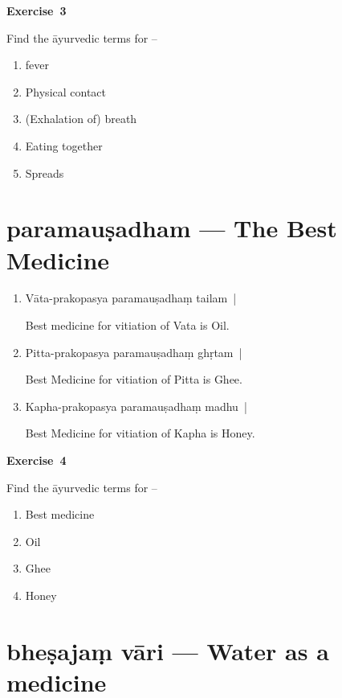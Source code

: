 \centerline{\textbf{Exercise~3}}

Find the āyurvedic terms for –
\begin{enumerate}
\itemsep=0pt
\renewcommand{\theenumi}{\alph{enumi}}
\renewcommand{\labelenumi}{\theenumi.}
\item fever
\item Physical contact 
\item (Exhalation of) breath
\item Eating together 
\item Spreads 
\end{enumerate}

\chapter{paramauṣadham --- The Best Medicine}

\begin{enumerate}
\itemsep=0pt
\item {}

Vāta-prakopasya paramauṣadhaṃ tailam~|

Best medicine for vitiation of Vata is Oil.

\item {}

Pitta-prakopasya paramauṣadhaṃ ghṛtam~|

Best Medicine for vitiation of Pitta is Ghee.

\item {}

Kapha-prakopasya paramauṣadhaṃ madhu~|

Best Medicine for vitiation of Kapha is Honey. 
\end{enumerate}

\centerline{\textbf{Exercise~4}}

Find the āyurvedic terms for –
\begin{enumerate}
\itemsep=0pt
\renewcommand{\theenumi}{\alph{enumi}}
\renewcommand{\labelenumi}{\theenumi.}
\item Best medicine 
\item Oil
\item Ghee 
\item Honey
\end{enumerate}

\chapter{bheṣajaṃ vāri --- Water as a medicine}

